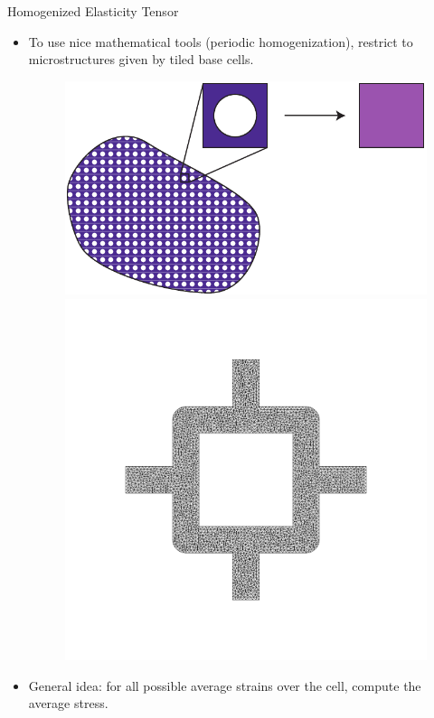 \begin{frame}{Homogenized Elasticity Tensor}
    \begin{itemize}
        \item To use nice mathematical tools (periodic homogenization), restrict
            to microstructures given by tiled base cells. 
            \begin{figure}
                \includegraphics[width=.50\textwidth]{Images/cell_homogenize.pdf}
                \includegraphics[width=.40\textwidth]{Images/base.png}
            \end{figure}
        \item General idea: for all possible average strains over the cell, compute the
              average stress.
    \end{itemize}
\end{frame}

